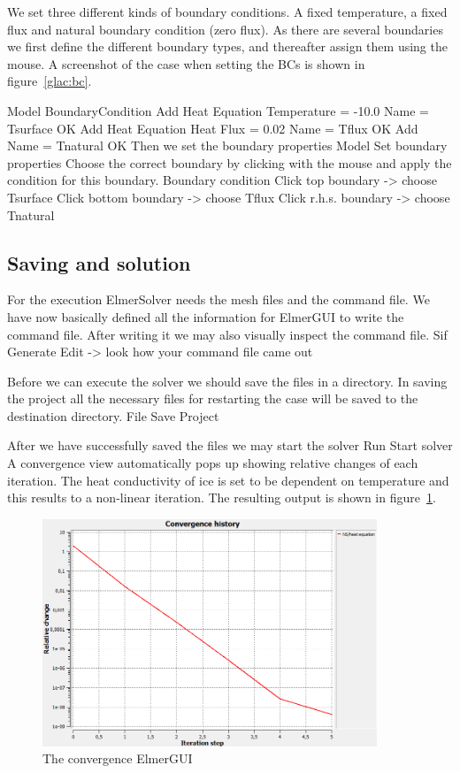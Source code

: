 We set three different kinds of boundary conditions. A fixed temperature, a fixed 
flux and natural boundary condition (zero flux). As there are several boundaries
we first define the different boundary types, and thereafter assign them using the mouse.
A screenshot of the case when setting the BCs is shown in figure~\ref{glac:bc}.

\ttbegin
Model
  BoundaryCondition
    Add 
      Heat Equation
        Temperature = -10.0
      Name = Tsurface
      OK
    Add 
      Heat Equation
        Heat Flux = 0.02
      Name = Tflux
      OK
    Add 
      Name = Tnatural
      OK
\ttend   
Then we set the boundary properties 
\ttbegin
Model 
  Set boundary properties  
\ttend
Choose the correct boundary by clicking with the mouse
and apply the condition for this boundary.
\ttbegin
Boundary condition
  Click top boundary -> choose Tsurface
  Click bottom boundary -> choose Tflux
  Click r.h.s. boundary -> choose Tnatural
\ttend

\subsection*{Saving and solution}

For the execution 
ElmerSolver needs the mesh files and the command file. We have now basically defined
all the information for ElmerGUI to write the command file. After writing it we may also visually 
inspect the command file.
\ttbegin
Sif 
  Generate
  Edit -> look how your command file came out  
\ttend

Before we can execute the solver we should save the files in a directory. In saving the project all the
necessary files for restarting the case will be saved to the 
destination directory.
\ttbegin
File 
  Save Project
\ttend

After we have successfully saved the files we may start the solver
\ttbegin
Run
  Start solver
\ttend
A convergence view automatically pops up showing relative changes of each iteration.
The heat conductivity of ice is set to be dependent on temperature and this results to a 
non-linear iteration.
The resulting output is shown in figure~\ref{glac:conv}.

\begin{figure}
\begin{center}
\includegraphics[width=100mm]{glacier_toy_convergence}
\caption{The convergence  ElmerGUI}\label{glac:conv}
\end{center}
\end{figure}


